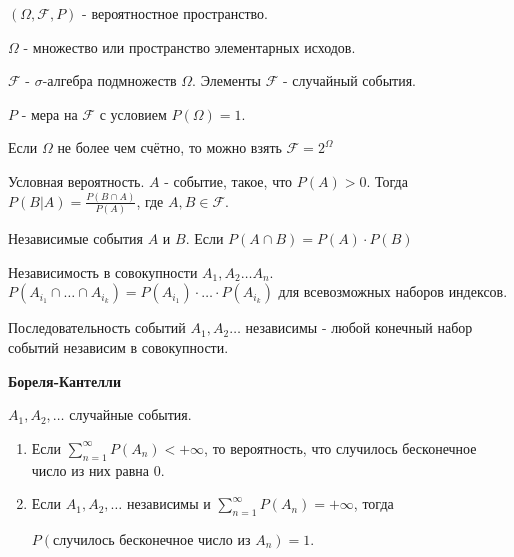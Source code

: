 
\begin{definition}
    $(\Omega, \mathcal{F}, P)$ - вероятностное пространство.

    $\Omega$ - множество или пространство элементарных исходов.

    $\mathcal{F}$ - $\sigma$-алгебра подмножеств $\Omega$. Элементы $\mathcal{F}$ - случайный события.

    $P$ - мера на $\mathcal{F}$ с условием $P(\Omega) = 1$.

    \begin{remark}
        Если $\Omega$ не более чем счётно, то можно взять $\mathcal{F} = 2^{\Omega}$
    \end{remark}
\end{definition}

\begin{definition}
    Условная вероятность. $A$ - событие, такое, что $P(A) > 0$.
    Тогда $P(B | A) = \frac{P(B \cap A)}{P(A)}$, где $A, B \in \mathcal{F}$.
\end{definition}

\begin{definition}
    Независимые события $A$ и $B$. Если $P(A \cap B) = P(A) \cdot P(B)$
\end{definition}

\begin{definition}
    Независимость в совокупности $A_1, A_2 \ldots A_n$. $P(A_{i_1} \cap \ldots \cap A_{i_k}) = P(A_{i_1}) \cdot \ldots \cdot P({A_{i_k}})$
    для всевозможных наборов индексов.
\end{definition}

\begin{definition}
    Последовательность событий $A_1, A_2 \ldots $ независимы - любой конечный набор событий
    независим в совокупности.
\end{definition}

\begin{lemma}
    \textbf{Бореля-Кантелли}

    $A_1, A_2, \ldots$ случайные события.

    \begin{enumerate}
        \item {
            Если $\sum_{n = 1}^{\infty} P(A_n) < +\infty$, то вероятность, что случилось бесконечное число из них равна 0.
        }
        \item {
            Если $A_1, A_2, \ldots$ независимы и $\sum_{n = 1}^{\infty} P(A_n) = +\infty$, тогда
            
            $P(\text{случилось бесконечное число из $A_n$}) = 1$.
        }
    \end{enumerate}
\end{lemma}

